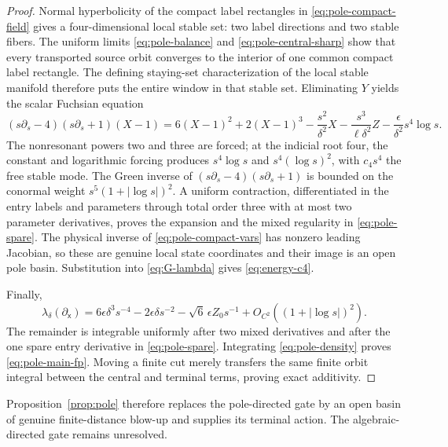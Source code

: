 \documentclass[11pt,reqno]{amsart}
\numberwithin{equation}{section}
\theoremstyle{definition}
\theoremstyle{remark}
\begin{document}
\begin{proof}
Normal hyperbolicity of the compact label rectangles in
\eqref{eq:pole-compact-field} gives a four-dimensional local stable set: two
label directions and two stable fibers.  The uniform limits
\eqref{eq:pole-balance} and \eqref{eq:pole-central-sharp} show that every
transported source orbit converges to the interior of one common compact
label rectangle.  The defining staying-set characterization of the local
stable manifold therefore puts the entire window in that stable set.
Eliminating $Y$ yields
the scalar Fuchsian equation
\begin{equation}\label{eq:Fuchsian}
 (s\partial_s-4)(s\partial_s+1)(X-1)
 =6(X-1)^2+2(X-1)^3
  -\frac{s^2}{\delta^2}X-\frac{s^3}{\ell\delta^2}Z
  -\frac{\epsilon}{\delta^2}s^4\log s.
\end{equation}
The nonresonant powers two and three are forced; at the indicial root four,
the constant and logarithmic forcing produces
$s^4\log s$ and $s^4(\log s)^2$, with $c_4s^4$ the free stable mode.  The
Green inverse of $(s\partial_s-4)(s\partial_s+1)$ is bounded on the conormal
weight $s^5(1+|\log s|)^2$.  A uniform contraction, differentiated in the
entry labels and parameters through total order three with at most two
parameter derivatives, proves the expansion and the mixed regularity in
\eqref{eq:pole-spare}.  The
physical inverse of \eqref{eq:pole-compact-vars} has nonzero leading
Jacobian, so these are genuine local state coordinates and their image is an
open pole basin.  Substitution into \eqref{eq:G-lambda} gives
\eqref{eq:energy-c4}.

Finally,
\begin{equation}\label{eq:pole-density}
 \lambda_\delta(\partial_{\mathsf x})
  =6\epsilon\delta^3s^{-4}-2\epsilon\delta s^{-2}
    -\sqrt6\,\epsilon Z_0s^{-1}
    +O_{C^2}((1+|\log s|)^2).
\end{equation}
The remainder is integrable uniformly after two mixed derivatives and after
the one spare entry derivative in \eqref{eq:pole-spare}.
Integrating \eqref{eq:pole-density} proves \eqref{eq:pole-main-fp}.  Moving a
finite cut merely transfers the same finite orbit integral between the
central and terminal terms, proving exact additivity.
\end{proof}

\noindent
Proposition~\ref{prop:pole} therefore replaces the pole-directed gate by an
open basin of genuine finite-distance blow-up and supplies its terminal
action.  The algebraic-directed gate remains unresolved.
\end{document}
